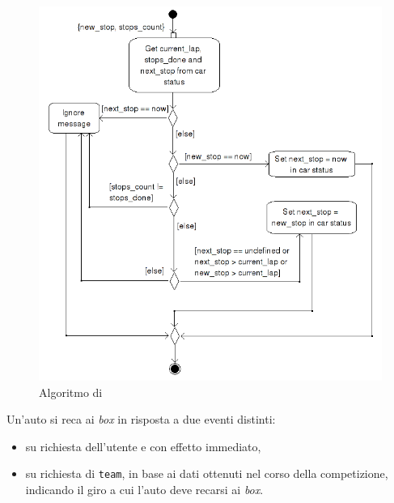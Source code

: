 \begin{figure}
\includegraphics[width=\textwidth]{diagrammi/NextPitstop}
\caption{Algoritmo di }
\label{fig:nextPitstop}
\end{figure}

Un'auto si reca ai \textit{box} in risposta a due eventi distinti:
\begin{itemize}
\item su richiesta dell'utente e con effetto immediato,
\item su richiesta di \texttt{team}, in base ai dati ottenuti nel corso della competizione, indicando il giro a cui l'auto deve recarsi ai \textit{box}.
\end{itemize}

